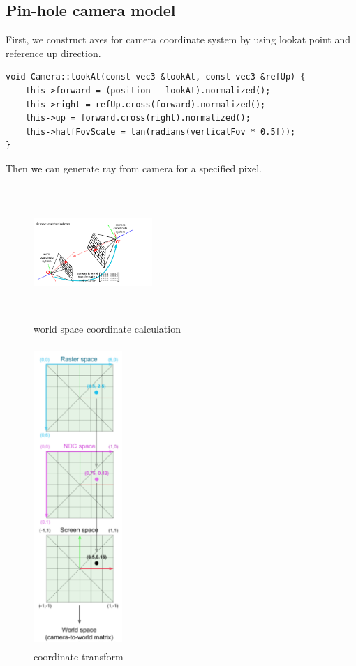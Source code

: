 \documentclass[acmtog]{acmart}
\begin{document}
\subsection{Pin-hole camera model}
First, we construct axes for camera coordinate system by using lookat point and reference up direction.
\begin{lstlisting}
void Camera::lookAt(const vec3 &lookAt, const vec3 &refUp) {
	this->forward = (position - lookAt).normalized();
	this->right = refUp.cross(forward).normalized();
	this->up = forward.cross(right).normalized();
	this->halfFovScale = tan(radians(verticalFov * 0.5f));
}
\end{lstlisting}
Then we can generate ray from camera for a specified pixel.
\begin{figure}[H]
	\centering
	\includegraphics[width=0.4\textwidth,height=2in]{camera.png}
	\caption{world space coordinate calculation}
\end{figure}
\begin{figure}[H]
	\centering
	\includegraphics[width=0.3\textwidth,height=4.5in]{transform.png}
	\caption{coordinate transform}
\end{figure}
\end{document}
